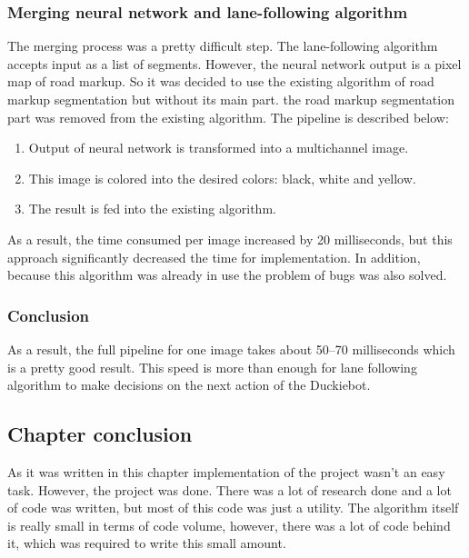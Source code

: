 \subsubsection{Merging neural network and lane-following algorithm}
The merging process was a pretty difficult step. The lane-following algorithm accepts input as a list of segments. 
However, the neural network output is a pixel map of road markup. So it was decided to use the existing algorithm of road markup segmentation but without its main part.
the road markup segmentation part was removed from the existing algorithm. The pipeline is described below:
\begin{enumerate}
    \item Output of neural network is transformed into a multichannel image.
    \item This image is colored into the desired colors: black, white and yellow.
    \item The result is fed into the existing algorithm.
\end{enumerate}  
As a result, the time consumed per image increased by 20 milliseconds, but this approach significantly decreased the time for implementation. 
In addition, because this algorithm was already in use the problem of bugs was also solved. 
\subsubsection{Conclusion}
As a result, the full pipeline for one image takes about 50--70 milliseconds which is a pretty good result. This speed is more than enough for lane following algorithm 
to make decisions on the next action of the Duckiebot.
\subsection{Chapter conclusion}
As it was written in this chapter implementation of the project wasn't an easy task. However, the project was done. There was a lot of research done and a lot of 
code was written, but most of this code was just a utility. The algorithm itself is really small in terms of code volume, however, there was a lot of code behind it, which was
required to write this small amount. 